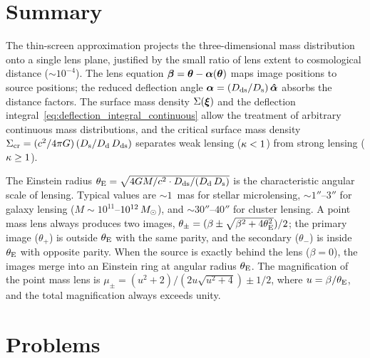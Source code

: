 \section{Summary}
\label{sec:lens_eq_summary}

The thin-screen approximation projects the three-dimensional mass
distribution onto a single lens plane, justified by the small ratio of
lens extent to cosmological distance ($\sim 10^{-4}$).  The lens equation
$\boldsymbol{\beta} = \boldsymbol{\theta} - \boldsymbol{\alpha}(\boldsymbol{\theta})$ maps image positions to
source positions; the reduced deflection angle
$\boldsymbol{\alpha} = (D_{\mathrm{ds}}/D_{\mathrm{s}})\,\boldsymbol{\hat{\alpha}}$ absorbs the distance
factors.  The surface mass density $\Sigma(\boldsymbol{\xi})$ and the deflection
integral~\eqref{eq:deflection_integral_continuous} allow the treatment of
arbitrary continuous mass distributions, and the critical surface mass
density $\Sigma_{\mathrm{cr}} = (c^2 / 4\pi G)\, (D_{\mathrm{s}} / D_{\mathrm{d}}\,D_{\mathrm{ds}})$
separates weak lensing ($\kappa < 1$) from strong lensing
($\kappa \geq 1$).

The Einstein radius $\theta_{\mathrm{E}} = \sqrt{4G M / c^2 \cdot
D_{\mathrm{ds}} / (D_{\mathrm{d}}\,D_{\mathrm{s}})}$ is the characteristic angular scale of lensing.
Typical values are $\sim 1$~mas for stellar microlensing,
$\sim 1''$--$3''$ for galaxy lensing ($M \sim 10^{11}$--$10^{12}\,M_{\odot}$),
and $\sim 30''$--$40''$ for cluster lensing.  A point mass lens always
produces two images, $\theta_\pm = (\beta \pm \sqrt{\beta^2 + 4\theta_{\mathrm{E}}^2})/2$;
the primary image ($\theta_+$) is outside $\theta_{\mathrm{E}}$ with the same
parity, and the secondary ($\theta_-$) is inside $\theta_{\mathrm{E}}$ with opposite
parity.  When the source is exactly behind the lens ($\beta = 0$), the
images merge into an Einstein ring at angular radius $\theta_{\mathrm{E}}$.  The
magnification of the point mass lens is
$\mu_\pm = (u^2 + 2) / (2u\sqrt{u^2 + 4}) \pm 1/2$, where
$u = \beta/\theta_{\mathrm{E}}$, and the total magnification always exceeds unity.


\section{Problems}
\label{sec:lens_eq_problems}

